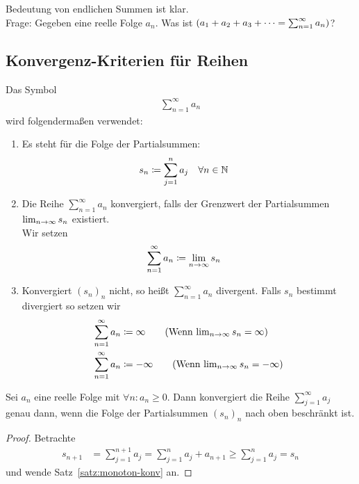 \thispagestyle{pagenumberonly}

Bedeutung von endlichen Summen ist klar.\\
Frage: Gegeben eine reelle Folge $a_n$. Was ist $\left(a_1 + a_2 + a_3 + \dots = \sum_{n=1}^{\infty} a_n\right)$?

\subsection{Konvergenz-Kriterien für Reihen}

\begin{definition} %
    Das Symbol
    \begin{align*}
        \sum_{n=1}^{\infty} a_n\tag{Sei $a_n$ eine reelle Folge}
    \end{align*}
    wird folgendermaßen verwendet:

    \begin{enumerate}[label=\alph*)]
        \item Es steht für die Folge der Partialsummen:
        \begin{align*}
            s_n&\coloneqq \sum_{j=1}^{n} a_j\quad\forall n\in\mathbb{N}
        \end{align*}
        \item Die Reihe $\sum_{n=1}^{\infty} a_n$ konvergiert, falls der Grenzwert der Partialsummen $\lim_{n\rightarrow{}\infty} s_n$ existiert.\\
        Wir setzen
        \begin{align*}
            \sum_{n=1}^{\infty} a_n &\coloneqq \lim_{n\rightarrow{}\infty} s_n
        \end{align*}
        \item Konvergiert $(s_n)_n$ nicht, so heißt $\sum_{n=1}^{\infty} a_n$ divergent. Falls $s_n$ bestimmt divergiert so setzen wir
        \begin{align*}
            \sum_{n=1}^{\infty} a_n &\definedas \infty \tag{Wenn $\lim_{n\fromto\infty} s_n = \infty$}\\
            \sum_{n=1}^{\infty} a_n &\definedas -\infty \tag{Wenn $\lim_{n\fromto\infty} s_n = -\infty$}
        \end{align*}
    \end{enumerate}
\end{definition}

\begin{satz} %
    \label{satz:mont-konv-reihen}
    Sei $a_n$ eine reelle Folge mit $\forall n\colon a_n\geq 0$. Dann konvergiert die Reihe $\sum_{j=1}^{\infty} a_j$ genau dann, wenn die Folge der Partialsummen $(s_n)_n$ nach oben beschränkt ist.

    \begin{proof}
        Betrachte
        \begin{align*}
            s_{n+1} &= \sum_{j=1}^{n+1} a_j = \sum_{j=1}^n a_j + a_{n+1} \geq \sum_{j=1}^{n} a_j = s_n
        \end{align*}
        und wende Satz~\ref{satz:monoton-konv} an.
    \end{proof}
\end{satz}

